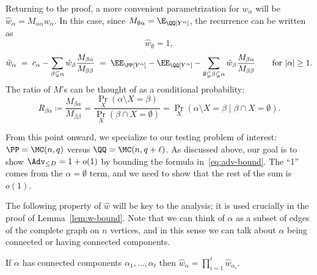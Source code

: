 \documentclass{article}
\begin{document}
Returning to the proof, a more convenient parametrization for $w_\alpha$ will be $\hat{w}_\alpha = M_{\alpha\alpha} w_\alpha$. In this case, since $M_{\emptyset \alpha} = \E_\QQ[Y^\alpha]$, the recurrence can be written as
\[ \hat{w}_\emptyset = 1, \]
\begin{equation}\label{eq:w-hat-recur}
\hat{w}_\alpha \;=\; c_\alpha - \sum_{\beta \subsetneq \alpha} \hat{w}_\beta \frac{M_{\beta\alpha}}{M_{\beta\beta}} \;=\; \EE_\PP[Y^\alpha] - \EE_\QQ[Y^\alpha] - \sum_{\emptyset \subsetneq \beta \subsetneq \alpha} \hat{w}_\beta \frac{M_{\beta\alpha}}{M_{\beta\beta}} \qquad \text{for } |\alpha| \ge 1.
\end{equation}
The ratio of $M$'s can be thought of as a conditional probability:
\begin{equation}\label{eq:R}
R_{\beta\alpha} \coloneqq \frac{M_{\beta\alpha}}{M_{\beta\beta}} = \frac{\Pr_X(\alpha \setminus X = \beta)}{\Pr_X(\beta \cap X = \emptyset)} = \Pr_X(\alpha \setminus X = \beta \;|\; \beta \cap X = \emptyset).
\end{equation}

From this point onward, we specialize to our testing problem of interest: $\PP = \MC(n,q)$ versus $\QQ = \MC(n,q+\ell)$. As discussed above, our goal is to show $\Adv_{\le D} = 1+o(1)$ by bounding the formula in~\eqref{eq:adv-bound}. The ``1'' comes from the $\alpha = \emptyset$ term, and we need to show that the rest of the sum is $o(1)$.

The following property of $\hat w$ will be key to the analysis; it is used crucially in the proof of Lemma~\ref{lem:w-bound}. Note that we can think of $\alpha$ as a subset of edges of the complete graph on $n$ vertices, and in this sense we can talk about $\alpha$ being connected or having connected components.

\begin{lemma}\label{lem:multiplicative}
If $\alpha$ has connected components $\alpha_1,\ldots,\alpha_t$ then $\hat w_\alpha = \prod_{i=1}^t \hat w_{\alpha_i}$.
\end{lemma}
\end{document}
